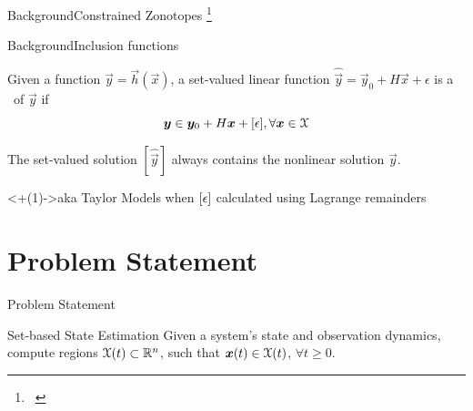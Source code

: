 \documentclass[aspectratio=169]{conf-beamer}
\begin{document}
\begin{frame}{Background}{Constrained Zonotopes \footnote{\articlesymbol\ \cite{scott2016constrained}}}
\end{frame}

\begin{frame}{Background}{Inclusion functions}

  Given a function $\vec{y} = \vec{h}(\vec{x})$,
  a set-valued linear function
  $\hat{\vec{y}} = \vec{y}_0 + H \vec{x} + \epsilon$
  is a \linearinclusionlong\ of $\vec{y}$ if
  $$\boldsymbol{y} \in \boldsymbol{y}_0 + H \boldsymbol{x} + [\mathcal{\epsilon}], \forall \boldsymbol{x} \in \mathcal{X}$$

  The set-valued solution $[\hat{\vec{y}}]$ always contains the nonlinear solution $\vec{y}$.

  \vfill
  \visible<+(1)->{aka Taylor Models when $[\mathcal{\epsilon}]$ calculated using Lagrange remainders}
\end{frame}

\section{Problem Statement}

\begin{frame}{Problem Statement}
  \begin{block}{Set-based State Estimation}
    Given a system's state and observation dynamics,\\ compute regions ${\mathcal{X}(t) \subset \mathbb{R}^n}$, such that $\boldsymbol{x}(t)\in\mathcal{X}(t)$, $\forall t\geq0$.
  \end{block}
\end{frame}
\end{document}
